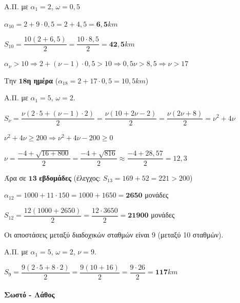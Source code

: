 \documentclass[11pt,a4paper,modern]{FFExercises}
\begin{document}
\lysh[38]
\begin{alist}
\item Α.Π. με $\alpha_1=2$, $\omega=0{,}5$

$\alpha_{10}=2+9\cdot 0{,}5=2+4{,}5=\boldsymbol{6{,}5}\si{km}$

\item $S_{10}=\dfrac{10(2+6{,}5)}{2}=\dfrac{10\cdot 8{,}5}{2}=\boldsymbol{42{,}5}\si{km}$

\item $\alpha_{\nu}>10 \Rightarrow 2+(\nu-1)\cdot 0{,}5>10 \Rightarrow 0{,}5\nu>8{,}5 \Rightarrow \nu>17$

Την $\boldsymbol{18}$\textbf{η ημέρα} ($\alpha_{18}=2+17\cdot 0{,}5=10{,}5\si{km}$)
\end{alist}

\lysh[39]
Α.Π. με $\alpha_1=5$, $\omega=2$.

$S_{\nu}=\dfrac{\nu(2\cdot 5+(\nu-1)\cdot 2)}{2}=\dfrac{\nu(10+2\nu-2)}{2}=\dfrac{\nu(2\nu+8)}{2}=\nu^2+4\nu$

$\nu^2+4\nu\geq 200 \Rightarrow \nu^2+4\nu-200\geq 0$

$\nu=\dfrac{-4+\sqrt{16+800}}{2}=\dfrac{-4+\sqrt{816}}{2}\approx\dfrac{-4+28{,}57}{2}=12{,}3$

Άρα σε $\boldsymbol{13}$ \textbf{εβδομάδες} (έλεγχος: $S_{13}=169+52=221>200$)

\lysh[40]
\begin{alist}
\item $\alpha_{12}=1000+11\cdot 150=1000+1650=\boldsymbol{2650}$ μονάδες

\item $S_{12}=\dfrac{12(1000+2650)}{2}=\dfrac{12\cdot 3650}{2}=\boldsymbol{21900}$ μονάδες
\end{alist}

\lysh[41]
Οι αποστάσεις μεταξύ διαδοχικών σταθμών είναι $9$ (μεταξύ 10 σταθμών).

Α.Π. με $\alpha_1=5$, $\omega=2$, $\nu=9$.

$S_9=\dfrac{9(2\cdot 5+8\cdot 2)}{2}=\dfrac{9(10+16)}{2}=\dfrac{9\cdot 26}{2}=\boldsymbol{117}\si{km}$

\paragraph{Σωστό - Λάθος}
\end{document}
